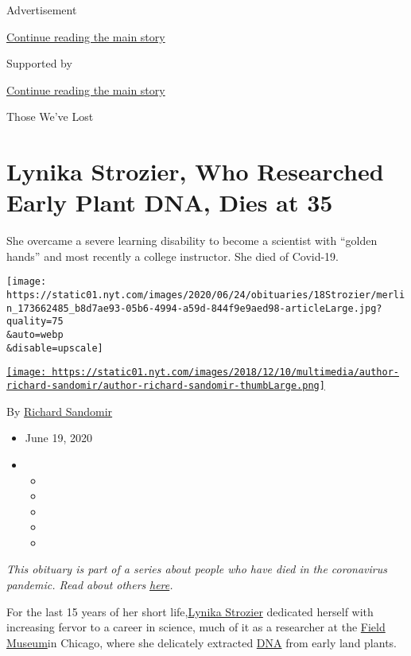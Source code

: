Advertisement

\protect\hyperlink{after-top}{Continue reading the main story}

Supported by

\protect\hyperlink{after-sponsor}{Continue reading the main story}

Those We've Lost

\hypertarget{lynika-strozier-who-researched-early-plant-dna-dies-at-35}{%
\section{Lynika Strozier, Who Researched Early Plant DNA, Dies at
35}\label{lynika-strozier-who-researched-early-plant-dna-dies-at-35}}

She overcame a severe learning disability to become a scientist with
``golden hands'' and most recently a college instructor. She died of
Covid-19.

\texttt{[image: https://static01.nyt.com/images/2020/06/24/obituaries/18Strozier/merlin\_173662485\_b8d7ae93-05b6-4994-a59d-844f9e9aed98-articleLarge.jpg?quality=75\\\&auto=webp\\\&disable=upscale]}

\href{https://www.nytimes.com/by/richard-sandomir}{\texttt{[image: https://static01.nyt.com/images/2018/12/10/multimedia/author-richard-sandomir/author-richard-sandomir-thumbLarge.png]}}

By \href{https://www.nytimes.com/by/richard-sandomir}{Richard Sandomir}

\begin{itemize}
\item
  June 19, 2020
\item
  \begin{itemize}
  \item
  \item
  \item
  \item
  \item
  \end{itemize}
\end{itemize}

\emph{This obituary is part of a series about people who have died in
the coronavirus pandemic. Read about others}
\href{https://www.nytimes.com/interactive/2020/obituaries/people-died-coronavirus-obituaries.html}{\emph{here}}\emph{.}

For the last 15 years of her short
life,\href{https://www.chicagotribune.com/news/ct-xpm-2012-02-06-ct-met-trice-hard-life-0206-20120206-story.html}{Lynika
Strozier} dedicated herself with increasing fervor to a career in
science, much of it as a researcher at the
\href{https://www.fieldmuseum.org/}{Field Museum}in Chicago, where she
delicately extracted
\href{https://www.nytimes.com/2020/07/04/health/coronavirus-neanderthals.html}{DNA}
from early land plants.

